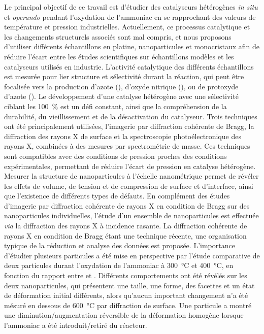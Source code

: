 \begin{mdframed}[linecolor=Prune,linewidth=1]
\begin{multicols}{2}
Le principal objectif de ce travail est d'étudier des catalyseurs hétérogènes \textit{in situ} et \textit{operando} pendant l'oxydation de l'ammoniac en se rapprochant des valeurs de température et pression industrielles.
Actuellement, ce processus catalytique et les changements structurels associés sont mal compris, et nous proposons d'utiliser différents échantillons en platine, nanoparticules et monocristaux afin de réduire l'écart entre les études scientifiques sur échantillons modèles et les catalyseurs utilisés en industrie.
L'activité catalytique des différents échantillons est mesurée pour lier structure et sélectivité durant la réaction, qui peut être focalisée vers la production d'azote (), d'oxyde nitrique (), ou de protoxyde d'azote ().
Le développement d'une catalyse hétérogène avec une sélectivité ciblant les \qty{100}{\percent} est un défi constant, ainsi que la compréhension de la durabilité, du vieillissement et de la désactivation du catalyseur.
Trois techniques ont été principalement utilisées, l'imagerie par diffraction cohérente de Bragg, la diffraction des rayons X de surface et la spectroscopie photoélectronique des rayons X, combinées à des mesures par spectrométrie de masse.
Ces techniques sont compatibles avec des conditions de pression proches des conditions expérimentales, permettant de réduire l'écart de pression en catalyse hétérogène.
Mesurer la structure de nanoparticules à l'échelle nanométrique permet de révéler les effets de volume, de tension et de compression de surface et d'interface, ainsi que l'existence de différents types de défauts.
En complément des études d'imagerie par diffraction cohérente de rayons X en condition de Bragg sur des nanoparticules individuelles, l'étude d'un ensemble de nanoparticules est effectuée \textit{via} la diffraction des rayons X à incidence rasante.
La diffraction cohérente de rayons X en condition de Bragg étant une technique récente, une organisation typique de la réduction et analyse des données est proposée.
L'importance d'étudier plusieurs particules a été mise en perspective par l'étude comparative de deux particules durant l'oxydation de l'ammoniac à \qty{300}{\degreeCelsius} et \qty{400}{\degreeCelsius}, en fonction du rapport entre  et .
Différents comportements ont été révélés sur les deux nanoparticules, qui présentent une taille, une forme, des facettes et un état de déformation initial différents, alors qu'aucun important changement n'a été mésuré en dessous de \qty{600}{\degreeCelsius} par diffraction de surface.
Une particule a montré une diminution/augmentation réversible de la déformation homogène lorsque l'ammoniac a été introduit/retiré du réacteur.

\end{multicols}
\end{mdframed}
